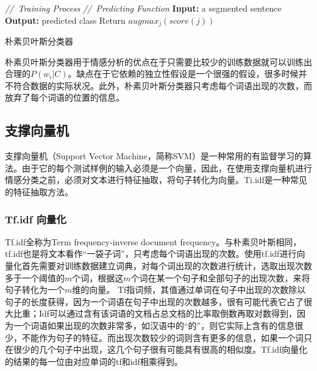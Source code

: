 \SetAlCapSkip{1em}
\begin{algorithm}
\emph{//\ Training Process}\;
\BlankLine
\emph{//\ Predicting Function}\;
\textbf{Input:} a segmented sentence\;
\textbf{Output:} predicted class\;
Return $augmax_{j}(score(j))$
\caption{朴素贝叶斯分类器}\label{Naive Bayes}
\label{alog:algorithm2}
\end{algorithm}\DecMargin{1em}

朴素贝叶斯分类器用于情感分析的优点在于只需要比较少的训练数据就可以训练出合理的$P(w_i|C)$。缺点在于它依赖的独立性假设是一个很强的假设，很多时候并不符合数据的实际状况。此外，朴素贝叶斯分类器只考虑每个词语出现的次数，而放弃了每个词语的位置的信息。
\subsection{支撑向量机}
支撑向量机（Support Vector Machine，简称SVM）是一种常用的有监督学习的算法。由于它的每个测试样例的输入必须是一个向量，因此，在使用支撑向量机进行情感分类之前，必须对文本进行特征抽取，将句子转化为向量。Ti.idf是一种常见的特征抽取方法。
\subsubsection{Tf.idf 向量化}
Tf.idf全称为Term frequency-inverse document frequency。与朴素贝叶斯相同，tf.idf也是将文本看作“一袋子词”，只考虑每个词语出现的次数。使用tf.idf进行向量化首先需要对训练数据建立词典，对每个词出现的次数进行统计，选取出现次数多于一个阈值的$m$个词，根据这$m$个词在某一个句子和全部句子的出现次数，来将句子转化为一个$m$维的向量。
Tf指词频，其值通过单词在句子中出现的次数除以句子的长度获得，因为一个词语在句子中出现的次数越多，很有可能代表它占了很大比重；Idf可以通过含有该词语的文档占总文档的比率取倒数再取对数得到，因为一个词语如果出现的次数非常多，如汉语中的“的”，则它实际上含有的信息很少，不能作为句子的特征。而出现次数较少的词则含有更多的信息，如果一个词只在很少的几个句子中出现，这几个句子很有可能具有很高的相似度。Tf.idf向量化的结果的每一位由对应单词的tf和idf相乘得到。
